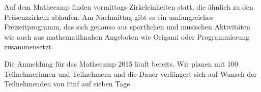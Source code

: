 \documentclass[12pt]{zettel}
\begin{document}
Auf dem Mathecamp finden vormittags Zirkeleinheiten statt, die ähnlich zu den Prä\-senz\-zir\-keln ablaufen. Am Nachmittag gibt es ein umfangreiches Freizeitprogramm, das sich genauso aus sportlichen und musischen Aktivitäten wie auch aus mathematiknahen Angeboten wie Origami oder Programmierung zusammensetzt.

\vfill

\newpage

Die Anmeldung für das Mathecamp 2015 läuft bereits. Wir planen mit 100 Teilnehmerinnen und Teilnehmern und die Dauer verlängert sich auf Wunsch der Teilnehmenden von fünf auf sieben Tage.




% 
% 
% 
% 
% 
% 
\end{document}
